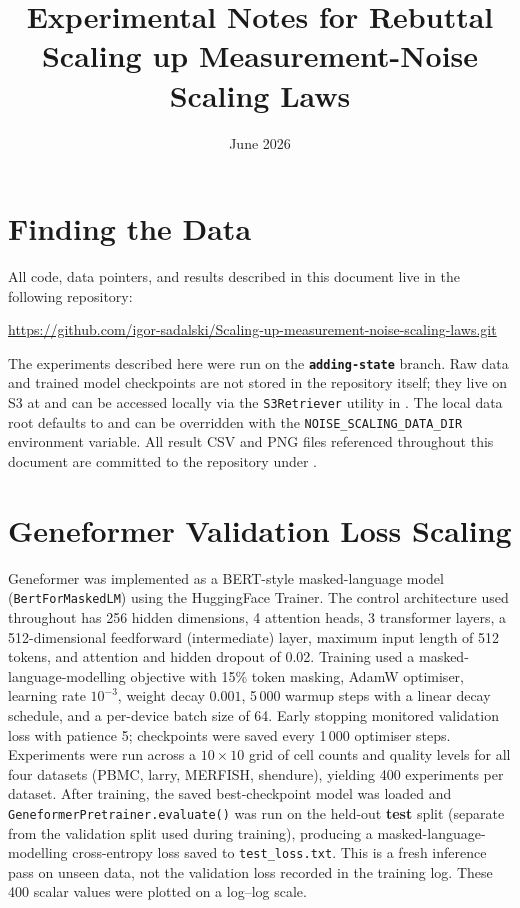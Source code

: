 \documentclass[11pt,a4paper]{article}
\title{Experimental Notes for Rebuttal\\[0.3em]
\large Scaling up Measurement-Noise Scaling Laws}
\author{}
\date{June 2026}
\begin{document}
\maketitle
\tableofcontents
\clearpage

\section{Finding the Data}

All code, data pointers, and results described in this document live in the
following repository:

\begin{center}
\url{https://github.com/igor-sadalski/Scaling-up-measurement-noise-scaling-laws.git}
\end{center}

\noindent The experiments described here were run on the \textbf{\texttt{adding-state}}
branch.
Raw data and trained model checkpoints are not stored in the repository itself;
they live on S3 at  and can
be accessed locally via the \texttt{S3Retriever} utility in
.
The local data root defaults to 
and can be overridden with the \texttt{NOISE\_SCALING\_DATA\_DIR} environment
variable.
All result CSV and PNG files referenced throughout this document are committed
to the repository under .
\clearpage

\section{Geneformer Validation Loss Scaling}

Geneformer was implemented as a BERT-style masked-language model
(\texttt{BertForMaskedLM}) using the HuggingFace Trainer.
The control architecture used throughout has 256 hidden dimensions,
4 attention heads, 3 transformer layers, a 512-dimensional feedforward
(intermediate) layer, maximum input length of 512 tokens, and attention
and hidden dropout of 0.02.
Training used a masked-language-modelling objective with 15\% token masking,
AdamW optimiser, learning rate $10^{-3}$, weight decay $0.001$,
5\,000 warmup steps with a linear decay schedule, and a per-device
batch size of 64.
Early stopping monitored validation loss with patience 5;
checkpoints were saved every 1\,000 optimiser steps.
Experiments were run across a $10 \times 10$ grid of cell counts and
quality levels for all four datasets (PBMC, larry, MERFISH, shendure),
yielding 400 experiments per dataset.
After training, the saved best-checkpoint model was loaded and
\texttt{GeneformerPretrainer.evaluate()} was run on the held-out
\textbf{test} split (separate from the validation split used during
training), producing a masked-language-modelling cross-entropy loss
saved to \texttt{test\_loss.txt}.
This is a fresh inference pass on unseen data, not the validation loss
recorded in the training log.
These 400 scalar values were plotted on a log--log scale.
\end{document}
